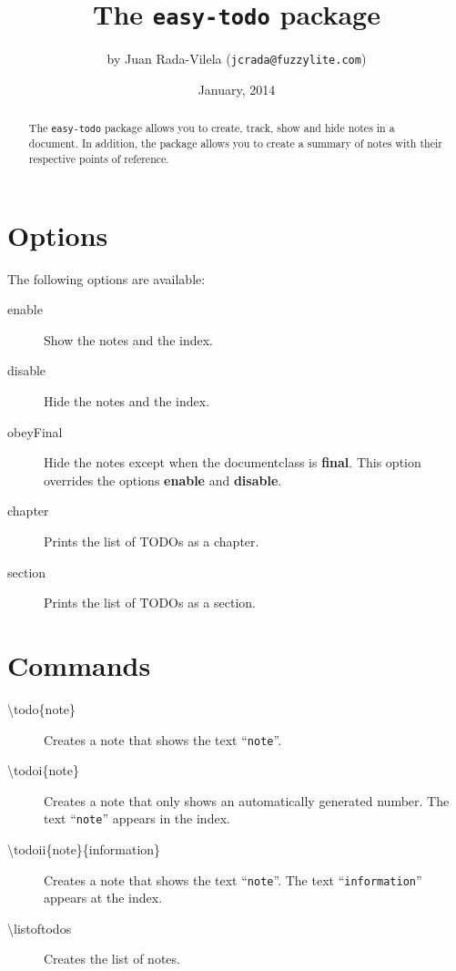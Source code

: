 \documentclass[a4paper]{article}
\begin{document}
	\title{The \texttt{easy-todo} package}
	\author{by Juan Rada-Vilela (\texttt{jcrada@fuzzylite.com})}
	\date{January, 2014}
	
	\maketitle
	
	\begin{abstract}
		The \texttt{easy-todo} package allows you to create, track, show and hide notes in a document. In addition, the package allows you to create a summary of notes with their respective points of reference. 
	\end{abstract}
	
	\section{Options}
	The following options are available:
	
	\begin{description}
        \item [enable] Show the notes and the index.
		\item [disable] Hide the notes and the index.
        \item [obeyFinal] Hide the notes except when the documentclass is \textbf{final}. This option overrides the options \textbf{enable} and \textbf{disable}.
		\item [chapter] Prints the list of TODOs as a chapter.
		\item [section] Prints the list of TODOs as a section.
	\end{description}
	

	\section{Commands}
	\begin{description}
		\item [\textbackslash todo\{note\}] Creates a note that shows the text ``\texttt{note}''.
        \item [\textbackslash todoi\{note\}] Creates a note that only shows an automatically generated number. The text ``\texttt{note}'' appears in the index.
        \item [\textbackslash todoii\{note\}\{information\}] Creates a note that shows the text ``\texttt{note}''. The text ``\texttt{information}'' appears at the index.
		\item [\textbackslash listoftodos] Creates the list of notes.
	\end{description}
    
\end{document}
